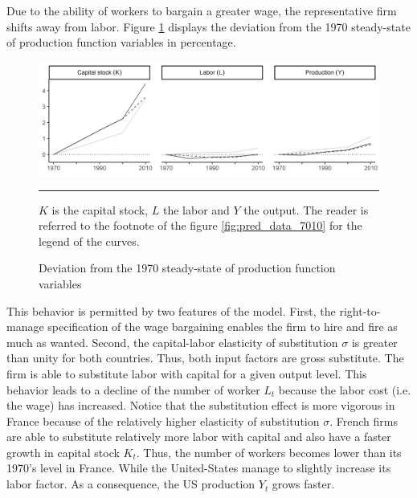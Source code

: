 Due to the ability of workers to bargain a greater wage, the representative firm shifts away from labor. Figure \ref{fig:dev_prod_7010} displays the deviation from the 1970 steady-state of production function variables in percentage.
\begin{figure}[tb]
	\centering
	\includegraphics[width=1\linewidth]{../result/deviation/dev_prod7010.png}
	\caption{Deviation from the 1970 steady-state of production function variables}
	\label{fig:dev_prod_7010}
	\vspace{.5ex}
	\hrule
	\vspace{-4ex}
	\justify\singlespacing\footnotesize $K$ is the capital stock, $L$ the labor and $Y$ the output. The reader is referred to the footnote of the figure \ref{fig:pred_data_7010} for the legend of the curves.
\end{figure}
This behavior is permitted by two features of the model. First, the right-to-manage specification of the wage bargaining enables the firm to hire and fire as much as wanted. Second, the capital-labor elasticity of substitution $\sigma$ is greater than unity for both countries. Thus, both input factors are gross substitute. The firm is able to substitute labor with capital for a given output level. This behavior leads to a decline of the number of worker $L_t$ because the labor cost (i.e. the wage) has increased. Notice that the substitution effect is more vigorous in France because of the relatively higher elasticity of substitution $\sigma$. French firms are able to substitute relatively more labor with capital and also have a faster growth in capital stock $K_t$. Thus, the number of workers becomes lower than its 1970's level in France. While the United-States manage to slightly increase its labor factor. As a consequence, the US production $Y_t$ grows faster.

